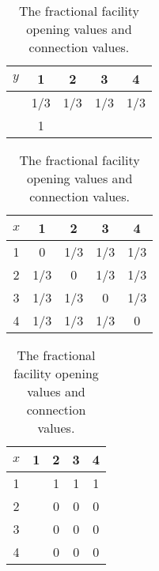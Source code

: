 \documentclass[11pt]{article}
\begin{document}
\begin{table}[ht]
  \begin{subtable}{0.3\textwidth}
  \centering
  \begin{tabular}{c | c c c c}
    $y$ & 1 & 2 & 3 & 4\\
    \hline
    & 1/3 & 1/3 & 1/3 & 1/3\\
    & 1 &  &  & \\
  \end{tabular}
\end{subtable}
%
\begin{subtable}{0.3\textwidth}
  \centering
  \begin{tabular}{c | c c c c}
    $x$ & 1 & 2 & 3 & 4\\
    \hline
    1 & 0 & 1/3 & 1/3 & 1/3\\
    2 & 1/3 & 0 & 1/3 & 1/3\\
    3 & 1/3 & 1/3 & 0 & 1/3\\
    4 & 1/3 & 1/3 & 1/3 & 0\\
  \end{tabular}
\end{subtable}
%
\begin{subtable}{0.3\textwidth}
  \centering
  \begin{tabular}{c | c c c c}
    $x$ & 1 & 2 & 3 & 4\\
    \hline
    1 &  & 1 & 1 & 1\\
    2 &  & 0 & 0 & 0\\
    3 &  & 0 & 0 & 0\\
    4 &  & 0 & 0 & 0\\
  \end{tabular}
\end{subtable}
\caption{The fractional facility opening values and connection values.}
\end{table}
\end{document}
